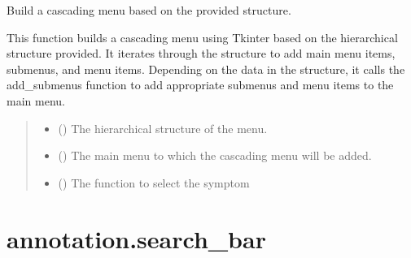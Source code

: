 \documentclass[letterpaper,10pt,english]{sphinxmanual}
\begin{document}
\begin{fulllineitems}
\label{\detokenize{annotation:annotation.exel_menus.build_menu}}
\pysigstartsignatures
{}
\pysigstopsignatures
\sphinxAtStartPar
Build a cascading menu based on the provided structure.

\sphinxAtStartPar
This function builds a cascading menu using Tkinter based on the
hierarchical structure provided. It iterates through the structure
to add main menu items, submenus, and menu items. Depending on the
data in the structure, it calls the add\_submenus function to add
appropriate submenus and menu items to the main menu.
\begin{quote}\begin{description}
\begin{itemize}
\item {} 
\sphinxAtStartPar
{} () \textendash{} The hierarchical structure of the menu.

\item {} 
\sphinxAtStartPar
{} () \textendash{} The main menu to which the cascading menu will be added.

\item {} 
\sphinxAtStartPar
{} () \textendash{} The function to select the symptom

\end{itemize}

\end{description}\end{quote}

\end{fulllineitems}



\section{annotation.search\_bar}
\label{\detokenize{annotation:module-annotation.search_bar}}\label{\detokenize{annotation:annotation-search-bar}}
\end{document}
